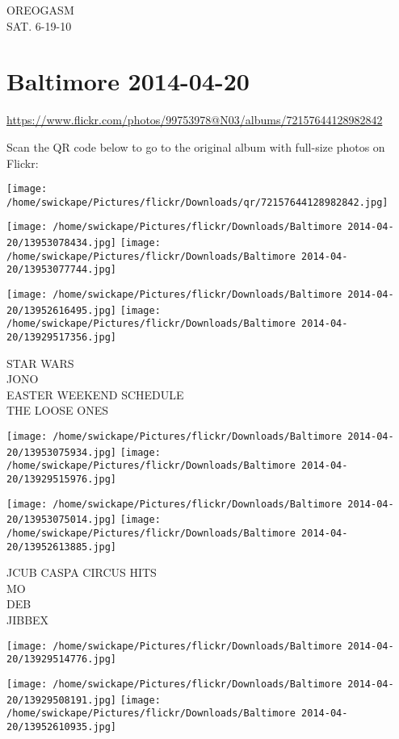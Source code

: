 \documentclass[10pt,letterpaper]{article}
\begin{document}
OREOGASM\\
SAT. 6{-}19{-}10
\pagebreak

\section*{Baltimore 2014-04-20}

\url{https://www.flickr.com/photos/99753978@N03/albums/72157644128982842}

Scan the QR code below to go to the original album with full-size photos on Flickr:

\texttt{[image: /home/swickape/Pictures/flickr/Downloads/qr/72157644128982842.jpg]}
\pagebreak

\texttt{[image: /home/swickape/Pictures/flickr/Downloads/Baltimore 2014-04-20/13953078434.jpg]}
\texttt{[image: /home/swickape/Pictures/flickr/Downloads/Baltimore 2014-04-20/13953077744.jpg]}

\texttt{[image: /home/swickape/Pictures/flickr/Downloads/Baltimore 2014-04-20/13952616495.jpg]}
\texttt{[image: /home/swickape/Pictures/flickr/Downloads/Baltimore 2014-04-20/13929517356.jpg]}

STAR WARS\\
JONO\\
EASTER WEEKEND SCHEDULE\\
THE LOOSE ONES
\pagebreak

\texttt{[image: /home/swickape/Pictures/flickr/Downloads/Baltimore 2014-04-20/13953075934.jpg]}
\texttt{[image: /home/swickape/Pictures/flickr/Downloads/Baltimore 2014-04-20/13929515976.jpg]}

\texttt{[image: /home/swickape/Pictures/flickr/Downloads/Baltimore 2014-04-20/13953075014.jpg]}
\texttt{[image: /home/swickape/Pictures/flickr/Downloads/Baltimore 2014-04-20/13952613885.jpg]}

JCUB CASPA CIRCUS HITS\\
MO\\
DEB\\
JIBBEX
\pagebreak

\texttt{[image: /home/swickape/Pictures/flickr/Downloads/Baltimore 2014-04-20/13929514776.jpg]}

\vspace{0.25in}
\texttt{[image: /home/swickape/Pictures/flickr/Downloads/Baltimore 2014-04-20/13929508191.jpg]}
\texttt{[image: /home/swickape/Pictures/flickr/Downloads/Baltimore 2014-04-20/13952610935.jpg]}
\end{document}
